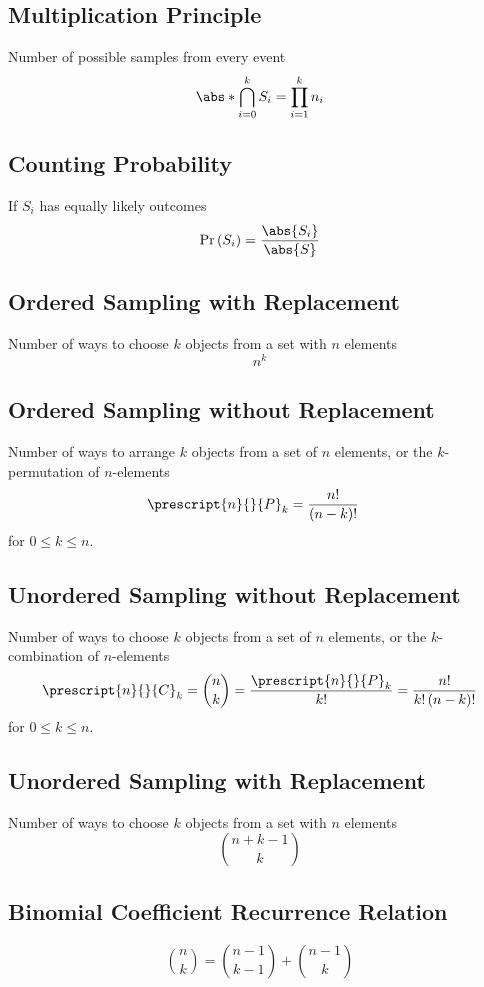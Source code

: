 \documentclass{article}
\begin{document}
\begin{multicols}{3}
    \subsection{Multiplication Principle}
    Number of possible samples from every event
    \begin{equation*}
        \abs*{\bigcap_{i=0}^{k} S_i} = \prod_{i = 1}^k n_i
    \end{equation*}
    \subsection{Counting Probability}
    If \(S_i\) has equally likely outcomes
    \begin{equation*}
        \Pr{\left( S_i \right)} = \frac{\abs{S_i}}{\abs{S}}
    \end{equation*}
    \subsection{Ordered Sampling with Replacement}
    Number of ways to choose \(k\) objects from a set with \(n\)
    elements
    \begin{equation*}
        n^k
    \end{equation*}
    \subsection{Ordered Sampling without Replacement}
    Number of ways to arrange \(k\) objects from a set of \(n\)
    elements, or the \(k\)-permutation of \(n\)-elements
    \begin{align*}
        \prescript{n}{}{P}_k & = \frac{n!}{\left( n - k \right)!}
    \end{align*}
    for \(0 \leq k \leq n\).
    \subsection{Unordered Sampling without Replacement}
    Number of ways to choose \(k\) objects from a set of \(n\)
    elements, or the \(k\)-combination of \(n\)-elements
    \begin{align*}
        \prescript{n}{}{C}_k = \binom{n}{k} = \frac{\prescript{n}{}{P}_k}{k!} = \frac{n!}{k! \left( n - k \right)!}
    \end{align*}
    for \(0 \leq k \leq n\).
    \subsection{Unordered Sampling with Replacement}
    Number of ways to choose \(k\) objects from a set with \(n\)
    elements
    \begin{equation*}
        \binom{n + k - 1}{k}
    \end{equation*}
    \subsection{Binomial Coefficient Recurrence Relation}
    \begin{equation*}
        \binom{n}{k} = \binom{n - 1}{k - 1} + \binom{n - 1}{k}
    \end{equation*}
\end{multicols}
\end{document}
